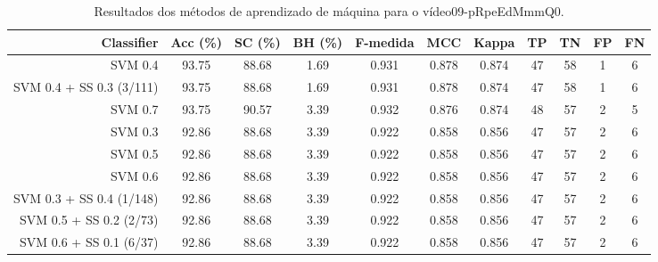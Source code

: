 \begin{table}[!htb]
\centering
\caption{Resultados dos métodos de aprendizado de máquina para o vídeo09-pRpeEdMmmQ0.}
\label{tab:09-pRpeEdMmmQ0}
\begin{tabular}{r|c|c|c|c|c|c|c|c|c|c}
\hline\hline
Classifier & Acc (\%) & SC (\%) & BH (\%) & F-medida & MCC & Kappa & TP & TN & FP & FN \\ \hline
SVM 0.4 & 93.75 & 88.68 & 1.69 & 0.931 & 0.878 & 0.874 & 47 & 58 & 1 & 6 \\ 
SVM 0.4 + SS 0.3 (3/111) & 93.75 & 88.68 & 1.69 & 0.931 & 0.878 & 0.874 & 47 & 58 & 1 & 6 \\ 
SVM 0.7 & 93.75 & 90.57 & 3.39 & 0.932 & 0.876 & 0.874 & 48 & 57 & 2 & 5 \\ 
SVM 0.3 & 92.86 & 88.68 & 3.39 & 0.922 & 0.858 & 0.856 & 47 & 57 & 2 & 6 \\ 
SVM 0.5 & 92.86 & 88.68 & 3.39 & 0.922 & 0.858 & 0.856 & 47 & 57 & 2 & 6 \\ 
SVM 0.6 & 92.86 & 88.68 & 3.39 & 0.922 & 0.858 & 0.856 & 47 & 57 & 2 & 6 \\ 
SVM 0.3 + SS 0.4 (1/148) & 92.86 & 88.68 & 3.39 & 0.922 & 0.858 & 0.856 & 47 & 57 & 2 & 6 \\ 
SVM 0.5 + SS 0.2 (2/73) & 92.86 & 88.68 & 3.39 & 0.922 & 0.858 & 0.856 & 47 & 57 & 2 & 6 \\ 
SVM 0.6 + SS 0.1 (6/37) & 92.86 & 88.68 & 3.39 & 0.922 & 0.858 & 0.856 & 47 & 57 & 2 & 6 \\ 
\hline\hline
\end{tabular}
\end{table}
